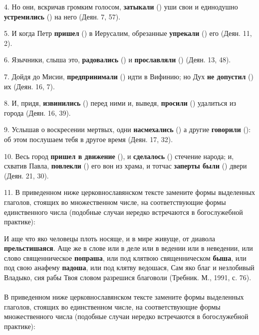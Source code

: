 \documentclass[11pt,a4paper,oneside]{memoir}
\newcommand{\exercise}{}
\begin{document}
    4. Но они, вскричав громким голосом, \textbf{затыкали} ({}) уши свои и единодушно \textbf{устремились} ({}) на него (Деян. 7, 57).
    
    5. И когда Петр \textbf{пришел} ({}) в Иерусалим, обрезанные \textbf{упрекали} ({}) его (Деян. 11, 2).
    
    6. Язычники, слыша это, \textbf{радовались} ({}) и \textbf{прославляли} ({}) (Деян. 13, 48).
    
    7. Дойдя до Мисии, \textbf{предпринимали} ({}) идти в Вифинию; но Дух \textbf{не допустил} ({}) их (Деян. 16, 7).
    
    8. И, придя, \textbf{извинились} ({}) перед ними и, выведя, \textbf{просили} ({}) удалиться из города (Деян. 16, 39).
    
    9. Услышав о воскресении мертвых, одни \textbf{насмехались} ({}) а другие \textbf{говорили} ({}): об этом послушаем тебя в другое время (Деян. 17, 32).
    
    10. Весь город \textbf{пришел в движение} ({}), и \textbf{сделалось} ({}) стечение народа; и, схватив Павла, \textbf{повлекли} ({}) его вон из храма, и тотчас \textbf{заперты были} ({}) двери (Деян. 21, 30).
    
    11. В приведенном ниже церковнославянском тексте замените формы выделенных глаголов, стоящих во множественном числе, на соответствующие формы единственного числа (подобные случаи нередко встречаются в богослужебной практике):
    
    И аще что яко человецы плоть носяще, и в мире живуще, от диавола \textbf{прельстишаяся}. Аще же в слове или в деле или в ведении или в неведении, или слово священническое \textbf{попраша}, или под клятвою священническом \textbf{быша}, или под свою анафему \textbf{падоша}, или под клятву ведошася, Сам яко благ и незлобивый Владыко, сия рабы Твоя словом разрешися благоволи (Требник. М., 1991, с. 76).

                    \paragraph{\exercise}
                    
    В приведенном ниже церковнославянском тексте замените формы выделенных глаголов, стоящих во единственном числе, на соответствующие формы множественного числа (подобные случаи нередко встречаются в богослужебной практике):
    
\end{document}
